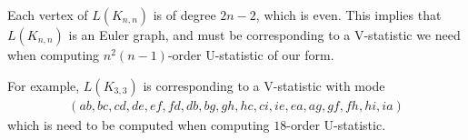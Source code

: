 \documentclass{article}
\newcommand{\completebig}[2]{K_{#1,#2}}
\begin{document}
\begin{remark}
    Each vertex of $L(\completebig{n}{n})$ is of degree $2n-2$, which is even. This implies that $L(\completebig{n}{n})$ is an Euler graph, and must be corresponding to a V-statistic we need when computing $n^2(n-1)$-order U-statistic of our form.

    For example, $L(\completebig{3}{3})$ is corresponding to a V-statistic with mode
    \begin{align*}
        (ab, bc, cd, de, ef, fd, db, bg, gh, hc, ci, ie, ea, ag, gf, fh, hi, ia)
    \end{align*}
    which is need to be computed when computing $18$-order U-statistic.
\end{remark}


\end{document}
